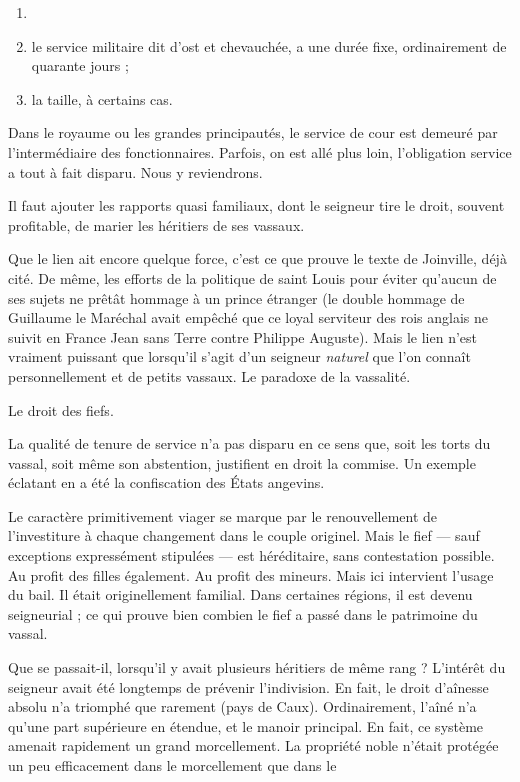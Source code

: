 \documentclass[french,twoside]{book} %
\newcommand{\labelchar}[1]{{\color{rubric}\bf #1}}
\begin{document}
\begin{enumerate}[itemsep=0pt,]
\item[] \hspace{-1.5em}{\bfseries Notamment :}
\item le service militaire dit d’ost et chevauchée, a une durée fixe, ordinairement de quarante jours ;
\item la taille, à certains cas.

\end{enumerate}\noindent Dans le royaume ou les grandes principautés, le service de cour est demeuré par l’intermédiaire des fonctionnaires. Parfois, on est allé plus loin, l’obligation service a tout à fait disparu. Nous y reviendrons.\par
Il faut ajouter les rapports quasi familiaux, dont le seigneur tire le droit, souvent profitable, de marier les héritiers de ses vassaux.\par
Que le lien ait encore quelque force, c’est ce que prouve le texte de Joinville, déjà cité. De même, les efforts de la politique de saint Louis pour éviter qu’aucun de ses sujets ne prêtât hommage à un prince étranger (le double hommage de Guillaume le Maréchal avait empêché que ce loyal serviteur des rois anglais ne suivit en France Jean sans Terre contre Philippe Auguste). Mais le lien n’est vraiment puissant que lorsqu’il s’agit d’un seigneur \emph{naturel} que l’on connaît personnellement et de petits vassaux. Le paradoxe de la vassalité.\par
\bigbreak
\noindent \labelchar{e)} Le droit des fiefs.\par
La qualité de tenure de service n’a pas disparu en ce sens que, soit les torts du vassal, soit même son abstention, justifient en droit la commise. Un exemple éclatant en a été la confiscation des États angevins.\par
Le caractère primitivement viager se marque par le renouvellement de l’investiture à chaque changement dans le couple originel. Mais le fief — sauf exceptions expressément stipulées — est héréditaire, sans contestation possible. Au profit des filles également. Au profit des mineurs. Mais ici intervient l’usage du bail. Il était originellement familial. Dans certaines régions, il est devenu seigneurial ; ce qui prouve bien combien le fief a passé dans le patrimoine du vassal.\par
Que se passait-il, lorsqu’il y avait plusieurs héritiers de même rang ? L’intérêt du seigneur avait été longtemps de prévenir l’indivision. En fait, le droit d’aînesse absolu n’a triomphé que rarement (pays de Caux). Ordinairement, l’aîné n’a qu’une part supérieure en étendue, et le manoir principal. En fait, ce système amenait rapidement un grand morcellement. La propriété noble n’était protégée un peu efficacement dans le morcellement que dans le  
\end{document}
